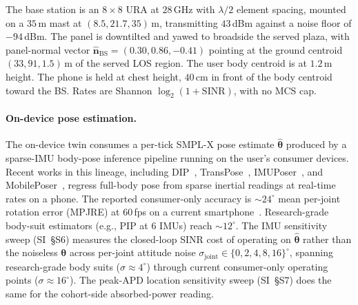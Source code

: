 \documentclass[journal,twocolumn,10pt]{IEEEtran}
\theoremstyle{plain}
\theoremstyle{definition}
\theoremstyle{remark}
\begin{document}
The base station is an $8\times 8$ URA at $28\,$GHz with
$\lambda/2$ element spacing, mounted on a $35\,$m mast at
$(8.5, 21.7, 35)\,$m, transmitting $43\,$dBm against a noise
floor of $-94\,$dBm. The panel is downtilted and yawed to
broadside the served plaza, with panel-normal vector
$\hat{\bm{n}}_\mathrm{BS} = (0.30, 0.86, -0.41)$ pointing at the
ground centroid $(33, 91, 1.5)\,$m of the served LOS region. The
user body centroid is at $1.2\,$m height. The phone is held at
chest height, $40\,$cm in front of the body centroid toward the
BS. Rates are Shannon $\log_2(1 + \mathrm{SINR})$, with no MCS
cap.

\paragraph*{On-device pose estimation.} The on-device twin
consumes a per-tick SMPL-X pose estimate $\hat{\bm{\theta}}$
produced by a sparse-IMU body-pose inference pipeline running
on the user's consumer devices. Recent works in this lineage,
including DIP~\cite{DIP2018}, TransPose~\cite{TransPose2021},
IMUPoser~\cite{Mollyn2023IMUPoser}, and
MobilePoser~\cite{Xu2024MobilePoser}, regress full-body pose from
sparse inertial readings at real-time rates on a phone. The
reported consumer-only accuracy is ${\sim}24^{\circ}$ mean
per-joint rotation error (MPJRE) at $60\,$fps on a current
smartphone~\cite{Xu2024MobilePoser}. Research-grade body-suit
estimators (e.g., PIP at $6$ IMUs) reach ${\sim}12^{\circ}$. The
IMU sensitivity sweep (SI~\S{}S6) measures the closed-loop SINR
cost of operating on $\hat{\bm{\theta}}$ rather than the
noiseless $\bm{\theta}$ across per-joint attitude noise
$\sigma_\mathrm{joint} \in \{0,2,4,8,16\}^{\circ}$, spanning
research-grade body suits ($\sigma \approx 4^{\circ}$) through
current consumer-only operating points
($\sigma \approx 16^{\circ}$). The peak-APD location sensitivity
sweep (SI~\S{}S7) does the same for the cohort-side absorbed-power
reading.
\end{document}
